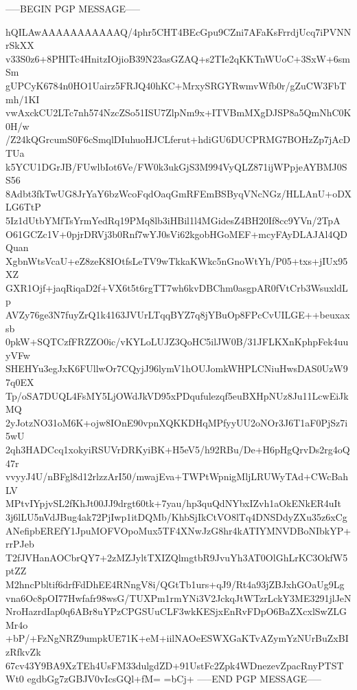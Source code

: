 -----BEGIN PGP MESSAGE-----

hQILAwAAAAAAAAAAAQ/4phr5CHT4BEcGpu9CZni7AFaKsFrrdjUcq7iPVNNrSkXX
v33S0z6+8PHITc4HnitzIOjioB39N23asGZAQ+s2TIe2qKKTnWUoC+3SxW+6smSm
gUPCyK6784n0HO1Uairz5FRJQ40hKC+MrxySRGYRwmvWfb0r/gZuCW3FbTmh/1KI
vwAxckCU2LTc7nh574NzcZSo51ISU7ZlpNm9x+ITVBmMXgDJSP8a5QmNhC0K0H/w
/Z24kQGrcumS0F6cSmqlDIuhuoHJCLferut+hdiGU6DUCPRMG7BOHzZp7jAcDTUa
k5YCU1DGrJB/FUwlbIot6Ve/FW0k3ukGjS3M994VyQLZ871ijWPpjeAYBMJ0SS56
8Adbt3fkTwUG8JrYaY6bzWcoFqdOaqGmRFEmBSByqVNcNGz/HLLAnU+oDXLG6TtP
5Iz1dUtbYMfTsYrmYedRq19PMq8lb3iHBil1l4MGidesZ4BH20If8cc9YVn/2TpA
O61GCZc1V+0pjrDRVj3b0Rnf7wYJ0sVi62kgobHGoMEF+mcyFAyDLAJAl4QDQuan
XgbnWtsVcaU+eZ8zeK8IOtfsLeTV9wTkkaKWkc5nGnoWtYh/P05+txs+jIUx95XZ
GXR1Ojf+jaqRiqaD2f+VX6t5t6rgTT7wh6kvDBChm0asgpAR0fVtCrb3WsuxldLp
AVZy76ge3N7fuyZrQ1k4163JVUrLTqqBYZ7q8jYBuOp8FPcCvUILGE++beuxaxsb
0pkW+SQTCzfFRZZO0ic/vKYLoLUJZ3QoHC5ilJW0B/31JFLKXnKphpFek4uuyVFw
SHEHYu3egJxK6FUllwOr7CQyjJ96lymV1hOUJomkWHPLCNiuHwsDAS0UzW97q0EX
Tp/oSA7DUQL4FsMY5LjOWdJkVD95xPDqufulezqf5euBXHpNUz8Ju11LcwEiJkMQ
2yJotzNO31oM6K+ojw8IOnE90vpnXQKKDHqMPfyyUU2oNOr3J6T1aF0PjSz7i5wU
2qh3HADCcq1xokyiRSUVrDRKyiBK+H5eV5/h92RBu/De+H6pHgQrvDs2rg4oQ47r
vvyyJ4U/nBFgl8d12rlzzArI50/mwajEva+TWPtWpnigMljLRUWyTAd+CWcBahLV
MPtvIYpjvSL2fKhJt00JJ9drgt60tk+7yau/hp3quQdNYbxIZvh1aOkENkER4uIt
3j6lLU5nVdJBug4ak72PjIwp1itDQMb/KhbSjIkCtVO8lTq4DNSDdyZXu35z6xCg
ANefipbEREfY1JpuMOFVOpoMux5TF4XNwJzG8hr4kATIYMNVDBoNIbkYP+rrPJeb
T2fJVHanAOCbrQY7+2zMZJyltTXIZQlmgtbR9JvuYh3AT0OlGhLrKC3OkfW5ptZZ
M2hncPbltif6drfFdDhEE4RNngV8i/QGtTb1urs+qJ9/Rt4a93jZBJxhGOaUg9Lg
vna6Oc8pOI77Hwfafr98wsG/TUXPm1rmYNi3V2JckqJtWTzrLckY3ME3291jlJeN
NroHazrdIap0q6ABr8uYPzCPGSUuCLF3wkKESjxEnRvFDpO6BaZXcxlSwZLGMr4o
+bP/+FzNgNRZ9umpkUE71K+eM+iilNAOeESWXGaKTvAZymYzNUrBuZxBIzRfkvZk
67cv43Y9BA9XzTEh4UsFM33dulgdZD+91UstFc2Zpk4WDnezevZpacRnyPTSTWt0
egdbGg7zGBJV0vIcsGQl+fM=
=bCj+
-----END PGP MESSAGE-----
